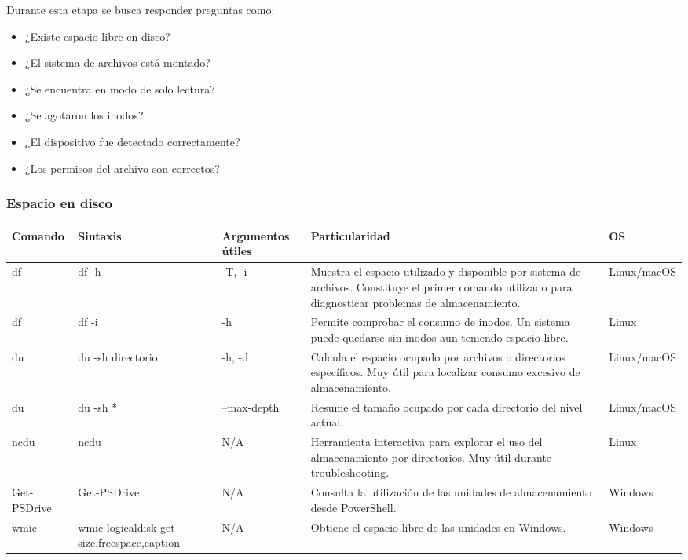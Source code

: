 \documentclass[a4paper,10pt]{article}
\begin{document}
Durante esta etapa se busca responder preguntas como:

\begin{itemize}
\item ¿Existe espacio libre en disco?
\item ¿El sistema de archivos está montado?
\item ¿Se encuentra en modo de solo lectura?
\item ¿Se agotaron los inodos?
\item ¿El dispositivo fue detectado correctamente?
\item ¿Los permisos del archivo son correctos?
\end{itemize}


\subsubsection{Espacio en disco}

\begin{longtable}{|p{2.8cm}|p{3.2cm}|p{4cm}|p{5.4cm}|p{1.5cm}|}

\hline
Comando &
Sintaxis &
Argumentos útiles &
Particularidad &
OS
\\
\hline
\endhead

df &
df -h &
-T, -i &
Muestra el espacio utilizado y disponible por sistema de archivos. Constituye el primer comando utilizado para diagnosticar problemas de almacenamiento. &
Linux/macOS
\\
\hline

df &
df -i &
-h &
Permite comprobar el consumo de inodos. Un sistema puede quedarse sin inodos aun teniendo espacio libre. &
Linux
\\
\hline

du &
du -sh directorio &
-h, -d &
Calcula el espacio ocupado por archivos o directorios específicos. Muy útil para localizar consumo excesivo de almacenamiento. &
Linux/macOS
\\
\hline

du &
du -sh * &
--max-depth &
Resume el tamaño ocupado por cada directorio del nivel actual. &
Linux/macOS
\\
\hline

ncdu &
ncdu &
N/A &
Herramienta interactiva para explorar el uso del almacenamiento por directorios. Muy útil durante troubleshooting. &
Linux
\\
\hline

Get-PSDrive &
Get-PSDrive &
N/A &
Consulta la utilización de las unidades de almacenamiento desde PowerShell. &
Windows
\\
\hline

wmic &
wmic logicaldisk get size,freespace,caption &
N/A &
Obtiene el espacio libre de las unidades en Windows. &
Windows
\\
\hline

\end{longtable}
\end{document}
